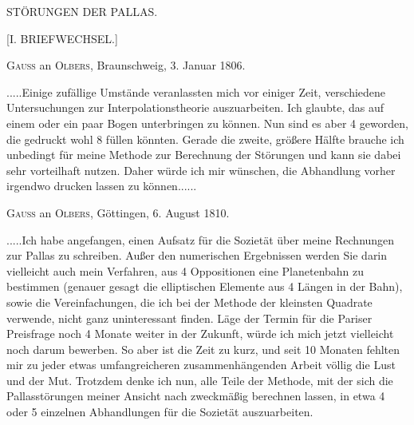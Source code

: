\clearpage
\thispagestyle{empty}
\vspace*{1.6in}
\begin{center}{\Large STÖRUNGEN DER PALLAS.\par}\end{center}
\clearpage
{}
\begin{center}
{\large [I. BRIEFWECHSEL.]\par}
\bigskip
{}
\textsc{Gauss} an \textsc{Olbers}, Braunschweig, 3. Januar 1806.
\end{center}
\noindent\hspace*{\parindent}.\quad.\quad.\quad.\quad.\quad Einige zufällige Umstände veranlassten mich vor einiger Zeit, verschiedene Untersuchungen zur Interpolationstheorie\HistoricalNoteEight{Vgl. Band III, S. 265.]} auszuarbeiten. Ich glaubte, das auf einem oder ein paar Bogen unterbringen zu können. Nun sind es aber 4 geworden, die gedruckt wohl 8 füllen könnten. Gerade die zweite, größere Hälfte brauche ich unbedingt für meine Methode zur Berechnung der Störungen und kann sie dabei sehr vorteilhaft nutzen. Daher würde ich mir wünschen, die Abhandlung vorher irgendwo drucken lassen zu können.\quad.\quad.\quad.\quad.\quad.
\par\bigskip
\begin{center}
\textsc{Gauss} an \textsc{Olbers}, Göttingen, 6. August 1810.
\end{center}
\noindent\hspace*{\parindent}.\quad.\quad.\quad.\quad.\quad Ich habe angefangen, einen Aufsatz\HistoricalNoteDouble{Vgl. Band VI, S. 1.]} für die Sozietät über meine Rechnungen zur Pallas zu schreiben. Außer den numerischen Ergebnissen werden Sie darin vielleicht auch mein Verfahren, aus 4 Oppositionen eine Planetenbahn zu bestimmen (genauer gesagt die elliptischen Elemente aus 4 Längen in der Bahn), sowie die Vereinfachungen, die ich bei der Methode der kleinsten Quadrate verwende, nicht ganz uninteressant finden. Läge der Termin für die Pariser Preisfrage noch 4 Monate weiter in der Zukunft, würde ich mich jetzt vielleicht noch darum bewerben. So aber ist die Zeit zu kurz, und seit 10 Monaten fehlten mir zu jeder etwas umfangreicheren zusammenhängenden Arbeit völlig die Lust und der Mut. Trotzdem denke ich nun, alle Teile der Methode, mit der sich die Pallasstörungen meiner Ansicht nach zweckmäßig berechnen lassen, in etwa 4 oder 5 einzelnen Abhandlungen für die Sozietät auszuarbeiten.
